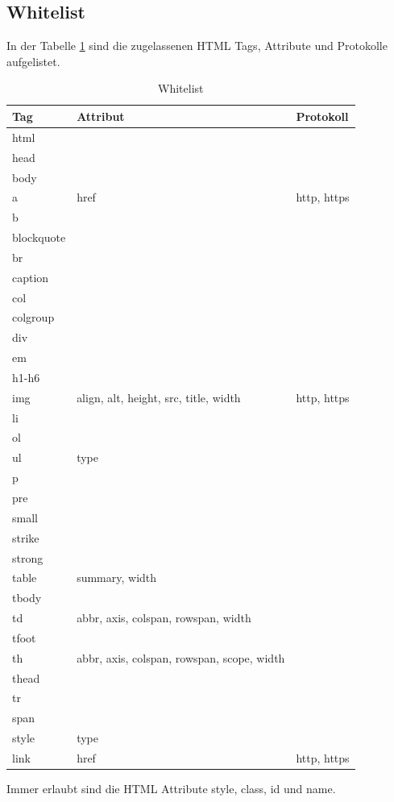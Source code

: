 \newpage

\subsection{Whitelist}
In der Tabelle \ref{tab:whitelist} sind die zugelassenen HTML Tags, Attribute und Protokolle aufgelistet.
\begin{table}[H]
\begin{center}
\begin{tabular}{l l l}
\hline
\textbf{Tag} & \textbf{Attribut} & \textbf{Protokoll} \\ \hline \hline
html & & \\ 
head & & \\ 
body & & \\ 
a & href & http, https \\ 
b & & \\ 
blockquote & & \\ 
br & & \\ 
caption & & \\ 
col & & \\ 
colgroup & & \\ 
div & & \\ 
em & & \\ 
h1-h6 & & \\
img & align, alt, height, src, title, width & http, https \\ 
li & & \\  
ol & & \\  
ul & type & \\  
p & & \\  
pre & & \\  
small & & \\  
strike & & \\  
strong & & \\  
table & summary, width & \\  
tbody & & \\  
td & abbr, axis, colspan, rowspan, width & \\  
tfoot & & \\  
th & abbr, axis, colspan, rowspan, scope, width & \\  
thead & & \\  
tr & & \\  
span & & \\  
style & type & \\  
link & href & http, https \\
\hline \hline
\end{tabular}
\caption{Whitelist}
\label{tab:whitelist}
\end{center}
\end{table}

Immer erlaubt sind die HTML Attribute style, class, id und name.
